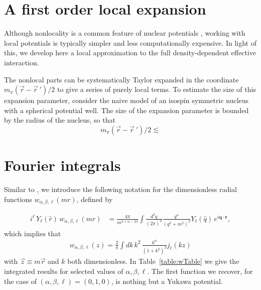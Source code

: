 \documentclass[%
 preprint,
 amsmath,amssymb,
 aps,
]{revtex4-1}
\newcommand{\w}[4]{w_{#1,#2,#3}(#4)}
\begin{document}
\section{A first order local expansion}

Although nonlocality is a common feature of nuclear potentials \cite{PhysRevC.53.R1483}, working with local potentials is typically simpler and less computationally expensive. In light of this, we develop here a local approximation to the full density-dependent effective interaction.

The nonlocal parts can be systematically Taylor expanded in the coordinate $m_\pi(\vec{r}-\vec{r}\:')/2$ to give a series of purely local terms. To estimate the size of this expansion parameter, consider the naive model of an isospin symmetric nucleus with a spherical potential well. The size of the expansion parameter is bounded by the radius of the nucleus, so that 
\begin{equation}
m_\pi(\vec{r}-\vec{r}\:')/2 \lesssim 
\end{equation}

\appendix

\section{\label{app:wNotation}Fourier integrals}

Similar to \cite{PhysRevC.85.024003}, we introduce the following notation for the dimensionless radial functions $\w{\alpha}{\beta}{\ell}{ m r }$, defined by

\begin{align}
i^\ell \, Y_\ell(\hat{r}) \, \w{\alpha}{\beta}{\ell}{ m r}  &= \frac{4 \pi}{m^{3+\alpha-2\beta} }  \int \frac{d^3 q}{(2\pi)^3} \frac{q^\alpha}{(q^2+m^2)^\beta} Y_\ell(\hat{q}) \, e^{i \mathbf{q} \cdot \mathbf{r}  },
\end{align}
which implies that
\begin{align}\label{eq:wDef}
\w{\alpha}{\beta}{\ell}{z} =  \frac{2}{\pi} \int dk \, k^2 \, \frac{k^\alpha}{(1+k^2)^\beta} j_\ell(k z)
\end{align}
with $\vec{z} \equiv m \vec{r}$ and $k$ both dimensionless. In Table~\ref{table:wTable} we give the integrated results for selected values of $\alpha, \beta, \ell$. The first function we recover, for the case of $(\alpha, \beta, \ell ) = (0,1,0)$, is nothing but a Yukawa potential.
\end{document}
